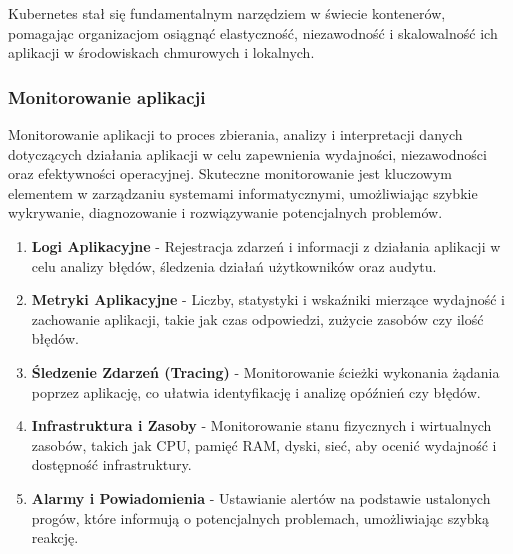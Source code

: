 Kubernetes stał się fundamentalnym narzędziem w świecie kontenerów, pomagając organizacjom osiągnąć elastyczność, niezawodność i skalowalność ich aplikacji w środowiskach chmurowych i lokalnych.
\subsubsection{Monitorowanie aplikacji}


\noindent Monitorowanie aplikacji to proces zbierania, analizy i interpretacji danych dotyczących działania aplikacji w celu zapewnienia wydajności, niezawodności oraz efektywności operacyjnej. Skuteczne monitorowanie jest kluczowym elementem w zarządzaniu systemami informatycznymi, umożliwiając szybkie wykrywanie, diagnozowanie i rozwiązywanie potencjalnych problemów.
\\


\begin{enumerate}
\item {\bf Logi Aplikacyjne}
   - Rejestracja zdarzeń i informacji z działania aplikacji w celu analizy błędów, śledzenia działań użytkowników oraz audytu.

\item {\bf Metryki Aplikacyjne}
   - Liczby, statystyki i wskaźniki mierzące wydajność i zachowanie aplikacji, takie jak czas odpowiedzi, zużycie zasobów czy ilość błędów.

\item {\bf Śledzenie Zdarzeń (Tracing)}
   - Monitorowanie ścieżki wykonania żądania poprzez aplikację, co ułatwia identyfikację i analizę opóźnień czy błędów.

\item {\bf Infrastruktura i Zasoby}
   - Monitorowanie stanu fizycznych i wirtualnych zasobów, takich jak CPU, pamięć RAM, dyski, sieć, aby ocenić wydajność i dostępność infrastruktury.

\item {\bf Alarmy i Powiadomienia}
   - Ustawianie alertów na podstawie ustalonych progów, które informują o potencjalnych problemach, umożliwiając szybką reakcję.
\end{enumerate}


